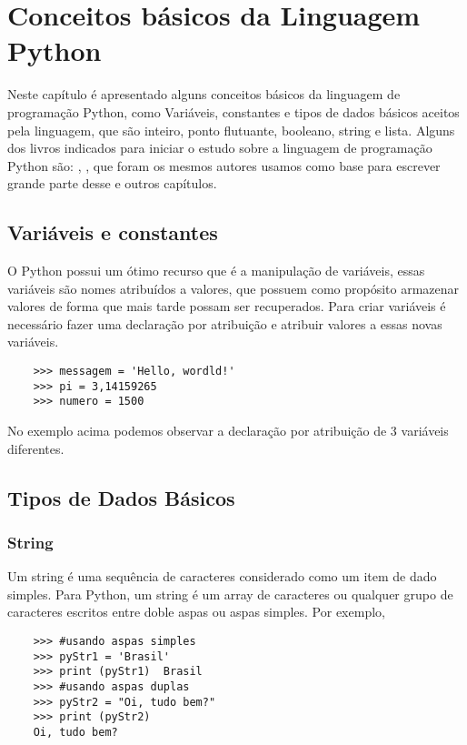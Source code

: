 

\chapter{ Conceitos básicos da Linguagem Python}

Neste capítulo é apresentado alguns conceitos básicos da linguagem de programação Python, como Variáveis, constantes e tipos de dados básicos aceitos pela linguagem, que são inteiro, ponto flutuante, booleano, string e lista. Alguns dos livros indicados para iniciar o estudo sobre a linguagem de programação Python são:  \cite{Lutz2007}, \cite{Perkovic2016}, que foram os mesmos autores usamos como base para escrever grande parte desse e outros capítulos.

    \section{Variáveis e constantes}
	O Python possui um ótimo recurso que é a manipulação de variáveis, essas variáveis são nomes atribuídos a valores, que possuem como propósito armazenar valores de forma que mais tarde possam ser recuperados. 
	Para criar variáveis é necessário fazer uma declaração por atribuição e atribuir valores a essas novas variáveis. 
	\begin{lstlisting}
	>>> messagem = 'Hello, wordld!'
	>>> pi = 3,14159265
	>>> numero = 1500
	\end{lstlisting}
	No exemplo acima podemos observar a declaração por atribuição de 3 variáveis diferentes.

    \section{Tipos de Dados B\'{a}sicos}

            \subsection{String}
            Um string \'{e} uma sequ\^{e}ncia de caracteres considerado como um item de dado simples. Para Python, um string \'{e} um array de caracteres ou qualquer grupo de caracteres escritos entre doble aspas ou aspas simples. Por exemplo,
    \begin{lstlisting}
    >>> #usando aspas simples
    >>> pyStr1 = 'Brasil'
    >>> print (pyStr1)  Brasil
    >>> #usando aspas duplas
    >>> pyStr2 = "Oi, tudo bem?"
    >>> print (pyStr2)
    Oi, tudo bem?
    \end{lstlisting}

